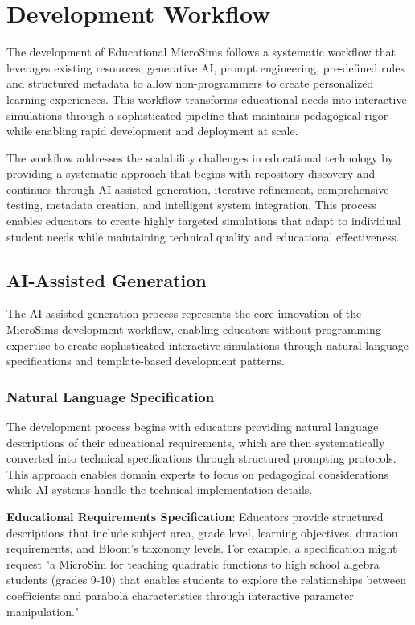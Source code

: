 \section{Development Workflow}
\label{sec:workflow}

The development of Educational MicroSims follows a systematic workflow that leverages existing resources, generative AI, prompt engineering, pre-defined rules and structured metadata to allow non-programmers to create personalized learning experiences. This workflow transforms educational needs into interactive simulations through a sophisticated pipeline that maintains pedagogical rigor while enabling rapid development and deployment at scale.

The workflow addresses the scalability challenges in educational technology by providing a systematic approach that begins with repository discovery and continues through AI-assisted generation, iterative refinement, comprehensive testing, metadata creation, and intelligent system integration. This process enables educators to create highly targeted simulations that adapt to individual student needs while maintaining technical quality and educational effectiveness.

\subsection{AI-Assisted Generation}

The AI-assisted generation process represents the core innovation of the MicroSims development workflow, enabling educators without programming expertise to create sophisticated interactive simulations through natural language specifications and template-based development patterns.

\subsubsection{Natural Language Specification}

The development process begins with educators providing natural language descriptions of their educational requirements, which are then systematically converted into technical specifications through structured prompting protocols. This approach enables domain experts to focus on pedagogical considerations while AI systems handle the technical implementation details.

\textbf{Educational Requirements Specification}: Educators provide structured descriptions that include subject area, grade level, learning objectives, duration requirements, and Bloom's taxonomy levels. For example, a specification might request "a MicroSim for teaching quadratic functions to high school algebra students (grades 9-10) that enables students to explore the relationships between coefficients and parabola characteristics through interactive parameter manipulation."

